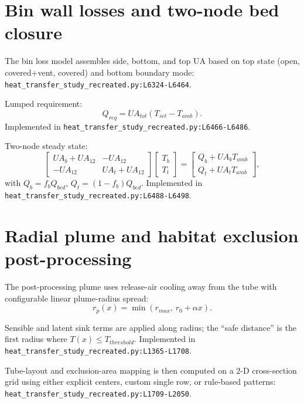 \documentclass[11pt]{article}
\newcommand{\srcref}[1]{\nolinkurl{#1}}
\begin{document}
\section{Bin wall losses and two-node bed closure}
The bin loss model assembles side, bottom, and top UA based on top state
(open, covered+vent, covered) and bottom boundary mode:
\srcref{heat_transfer_study_recreated.py:L6324-L6464}.

Lumped requirement:
\begin{equation}
Q_{req} = UA_{tot}(T_{set}-T_{amb}).
\end{equation}
Implemented in \srcref{heat_transfer_study_recreated.py:L6466-L6486}.

Two-node steady state:
\begin{equation}
\begin{bmatrix}
UA_b + UA_{12} & -UA_{12} \\
-UA_{12} & UA_t + UA_{12}
\end{bmatrix}
\begin{bmatrix}T_b\\T_t\end{bmatrix}
=
\begin{bmatrix}
Q_b + UA_b T_{amb}\\
Q_t + UA_t T_{amb}
\end{bmatrix},
\end{equation}
with \(Q_b=f_b Q_{bed}\), \(Q_t=(1-f_b)Q_{bed}\).
Implemented in \srcref{heat_transfer_study_recreated.py:L6488-L6498}.

\section{Radial plume and habitat exclusion post-processing}
The post-processing plume uses release-air cooling away from the tube with
configurable linear plume-radius spread:
\begin{equation}
r_p(x)=\min\!\left(r_{max},\,r_0+\alpha x\right).
\end{equation}

Sensible and latent sink terms are applied along radius; the ``safe distance''
is the first radius where \(T(x)\le T_{threshold}\).
Implemented in
\srcref{heat_transfer_study_recreated.py:L1365-L1708}.

Tube-layout and exclusion-area mapping is then computed on a 2-D cross-section
grid using either explicit centers, custom single row, or rule-based patterns:
\srcref{heat_transfer_study_recreated.py:L1709-L2050}.
\end{document}

